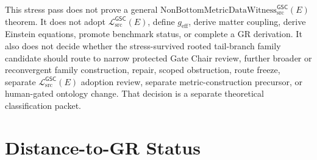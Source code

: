 \documentclass[11pt]{article}
\newcommand{\Witness}{\mathrm{NonBottomMetricDataWitness}_{\mathrm{src}}^{\mathsf{GSC}}}
\newcommand{\MetricData}{\mathcal{L}_{\mathrm{src}}^{\mathsf{GSC}}}
\newcommand{\geff}{g_{\mathrm{eff}}}
\begin{document}
This stress pass does not prove a general \(\Witness(E)\) theorem. It does
not adopt \(\MetricData(E)\), define \(\geff\), derive matter coupling, derive
Einstein equations, promote benchmark status, or complete a GR derivation. It
also does not decide whether the stress-survived rooted tail-branch family
candidate should route to narrow protected Gate Chair review, further broader
or reconvergent family construction, repair, scoped obstruction, route
freeze, separate \(\MetricData(E)\) adoption review, separate
metric-construction precursor, or human-gated ontology change. That decision
is a separate theoretical classification packet.

\section{Distance-to-GR Status}
\end{document}
